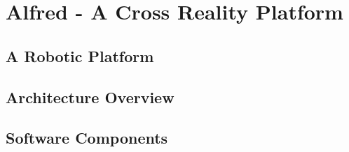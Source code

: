 \section{Alfred - A Cross Reality Platform}


\subsection{A Robotic Platform}

\subsection{Architecture Overview}

\subsection{Software Components}